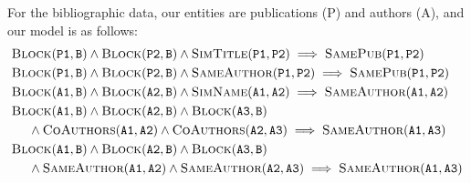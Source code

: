 \documentclass{article}
\begin{document}
For the bibliographic data, our entities are publications (P) and authors (A), and our model is as follows:
\begin{eqnarray}
	\begin{aligned}
        & \textsc{Block}(\texttt{P1}, \texttt{B}) \wedge \textsc{Block}(\texttt{P2}, \texttt{B}) \wedge \textsc{SimTitle}(\texttt{P1},\texttt{P2}) \implies \textsc{SamePub}(\texttt{P1},\texttt{P2})\\ \nonumber
        & \textsc{Block}(\texttt{P1}, \texttt{B}) \wedge \textsc{Block}(\texttt{P2}, \texttt{B}) \wedge \textsc{SameAuthor}(\texttt{P1},\texttt{P2}) \implies \textsc{SamePub}(\texttt{P1},\texttt{P2})\\ \nonumber
        & \textsc{Block}(\texttt{A1}, \texttt{B}) \wedge \textsc{Block}(\texttt{A2}, \texttt{B}) \wedge \textsc{SimName}(\texttt{A1},\texttt{A2}) \implies \textsc{SameAuthor}(\texttt{A1},\texttt{A2})\\ \nonumber
        & \textsc{Block}(\texttt{A1}, \texttt{B}) \wedge \textsc{Block}(\texttt{A2}, \texttt{B})  \wedge \textsc{Block}(\texttt{A3}, \texttt{B}) \\ \nonumber 
        & \ \ \ \  \wedge  \textsc{CoAuthors}(\texttt{A1}, \texttt{A2}) \wedge \textsc{CoAuthors}(\texttt{A2}, \texttt{A3}) \implies \textsc{SameAuthor}(\texttt{A1},\texttt{A3})  \\ \nonumber
        & \textsc{Block}(\texttt{A1}, \texttt{B}) \wedge \textsc{Block}(\texttt{A2}, \texttt{B})  \wedge \textsc{Block}(\texttt{A3}, \texttt{B}) \\ \nonumber 
        & \ \ \ \  \wedge  \textsc{SameAuthor}(\texttt{A1}, \texttt{A2}) \wedge \textsc{SameAuthor}(\texttt{A2}, \texttt{A3}) 
        \implies \textsc{SameAuthor}(\texttt{A1},\texttt{A3}) 
	\end{aligned}
\end{eqnarray}
\end{document}
